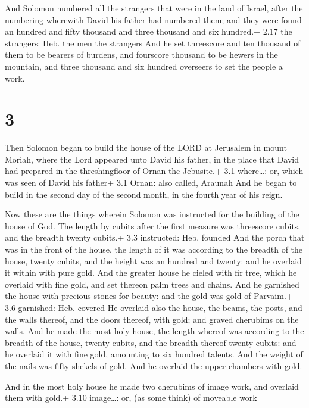  And Solomon numbered all the strangers that were in the
land of Israel, after the numbering wherewith David his father had
numbered them; and they were found an hundred and fifty thousand and
three thousand and six hundred.+ 2.17 the strangers: Heb. the men the
strangers  And he set threescore and ten thousand of them
to be bearers of burdens, and fourscore thousand to be hewers in the
mountain, and three thousand and six hundred overseers to set the people
a work.

\hypertarget{section-2}{%
\section{3}\label{section-2}}

 Then Solomon began to build the house of the LORD at
Jerusalem in mount Moriah, where the Lord appeared unto David his
father, in the place that David had prepared in the threshingfloor of
Ornan the Jebusite.+ 3.1 where\ldots: or, which was seen of David his
father+ 3.1 Ornan: also called, Araunah  And he began to
build in the second day of the second month, in the fourth year of his
reign.

 Now these are the things wherein Solomon was instructed
for the building of the house of God. The length by cubits after the
first measure was threescore cubits, and the breadth twenty cubits.+ 3.3
instructed: Heb. founded  And the porch that was in the
front of the house, the length of it was according to the breadth of the
house, twenty cubits, and the height was an hundred and twenty: and he
overlaid it within with pure gold.  And the greater house he
cieled with fir tree, which he overlaid with fine gold, and set thereon
palm trees and chains.  And he garnished the house with
precious stones for beauty: and the gold was gold of Parvaim.+ 3.6
garnished: Heb. covered  He overlaid also the house, the
beams, the posts, and the walls thereof, and the doors thereof, with
gold; and graved cherubims on the walls.  And he made the
most holy house, the length whereof was according to the breadth of the
house, twenty cubits, and the breadth thereof twenty cubits: and he
overlaid it with fine gold, amounting to six hundred talents.
 And the weight of the nails was fifty shekels of gold. And
he overlaid the upper chambers with gold.

 And in the most holy house he made two cherubims of image
work, and overlaid them with gold.+ 3.10 image\ldots: or, (as some
think) of moveable work


